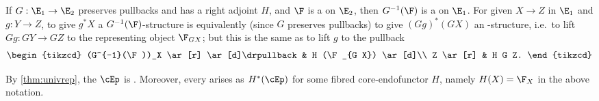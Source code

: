 \begin{eg}
  If $G:\E_1\to\E_2$ preserves pullbacks and has a right adjoint $H$, and $\F$ is a \local \nfs on $\E_2$, then $G^{-1}(\F)$ is a \local \nfs on $\E_1$.
  For given $X\to Z$ in $\E_1$ and $g:Y\to Z$, to give $g^*X$ a $G^{-1}(\F)$-structure is equivalently (since $G$ preserves pullbacks) to give $(G g)^*(G X)$ an \F-structure, i.e.\ to lift $G g : G Y \to G Z$ to the representing object $\F_{G X}$; but this is the same as to lift $g$ to the pullback
  \[
    \begin{tikzcd}
      (G^{-1}(\F))_X \ar[r] \ar[d]\drpullback & H (\F_{G X}) \ar[d]\\
      Z \ar[r] & H G Z.
    \end{tikzcd}
  \]
\end{eg}

\begin{eg}\label{thm:ep-local}
  By \cref{thm:univrep}, the \nfs $\cEp$ is \local.
  Moreover, every \local \nfs arises as $H^*(\cEp)$ for some fibred core-endofunctor $H$, namely $H(X) = \F_X$ in the above notation.
\end{eg}

